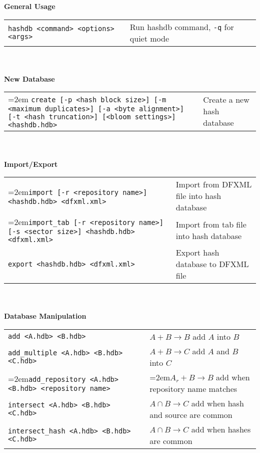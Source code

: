 \begin{small}
\begin{footnotesize}
\textbf{General Usage} \\
\begin{tabular}{p{3.6 in} p{3.0 in}}
\texttt{hashdb <command> <options> <args>} & Run hashdb command, \texttt{-q} for quiet mode \\
\end{tabular}
\\
\\
\textbf{New Database} \\
\begin{tabular}{p{3.6 in} p{3.0 in}}
\hangindent=2em \texttt{create [-p <hash block size>] [-m <maximum duplicates>] [-a <byte alignment>] [-t <hash truncation>] [<bloom settings>] <hashdb.hdb>} &
Create a new hash database \\
\end{tabular}
\\
\\
\textbf{Import/Export} \\
\begin{tabular}{p{3.6 in} p{3.0 in}}
\hangindent=2em\texttt{import [-r <repository name>] <hashdb.hdb> <dfxml.xml>} &
Import from DFXML file into hash database \\
\hangindent=2em\texttt{import\_tab [-r <repository name>] [-s <sector size>] <hashdb.hdb> <dfxml.xml>} &
Import from tab file into hash database \\
\texttt{export <hashdb.hdb> <dfxml.xml>} &
Export hash database to DFXML file \\
\end{tabular}
\\
\\
\textbf{Database Manipulation} \\
\begin{tabular}{p{3.6 in} p{3.0 in}}
\texttt{add <A.hdb> <B.hdb>} & $A + B \rightarrow B$ add $A$ into $B$ \\
\texttt{add\_multiple <A.hdb> <B.hdb> <C.hdb>} & $A + B \rightarrow C$ add $A$ and $B$ into $C$\\
\hangindent=2em\texttt{add\_repository <A.hdb> <B.hdb> <repository name>} & \hangindent=2em$A_r + B \rightarrow B$ add when repository name matches \\
\texttt{intersect <A.hdb> <B.hdb> <C.hdb>} & $A \cap B \rightarrow C$ add when hash and source are common\\
\texttt{intersect\_hash <A.hdb> <B.hdb> <C.hdb>} & $A \cap B \rightarrow C$ add when hashes are common\\

\end{tabular}
\end{footnotesize}
\end{small}
